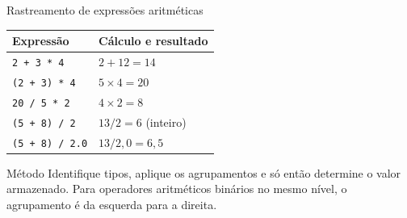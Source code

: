 \begin{frame}{Rastreamento de expressões aritméticas}
\begin{center}
\begin{tabular}{ll}
\toprule
Expressão & Cálculo e resultado \\
\midrule
\texttt{2 + 3 * 4} & $2 + 12 = 14$ \\
\texttt{(2 + 3) * 4} & $5 \times 4 = 20$ \\
\texttt{20 / 5 * 2} & $4 \times 2 = 8$ \\
\texttt{(5 + 8) / 2} & $13 / 2 = 6$ (inteiro) \\
\texttt{(5 + 8) / 2.0} & $13 / 2{,}0 = 6{,}5$ \\
\bottomrule
\end{tabular}
\end{center}
\begin{block}{Método}
Identifique tipos, aplique os agrupamentos e só então determine o valor armazenado. Para operadores aritméticos binários no mesmo nível, o agrupamento é da esquerda para a direita.
\end{block}
\end{frame}
